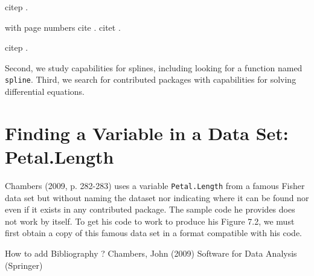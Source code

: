 citep \citep{JC09}.

with page numbers
cite \cite[pp. 282-283]{JC09}.
citet \citet[pp. 282-283]{JC09}.

citep \citep[pp. 282-283]{JC09}.

Second, we study \R{} capabilities
for splines, including looking for a function named {\tt spline}.  Third,
we search for contributed \R{} packages with capabilities for solving
differential equations.

\section*{Finding a Variable in a Data Set:  Petal.Length}

\citep[pp. 282-283]{JC09}
Chambers (2009, p. 282-283) uses a variable {\tt Petal.Length} from a
famous Fisher data set but without naming the dataset nor indicating
where it can be found nor even if it exists in any contributed \R{}
package.  The sample code he provides does not work by itself.  To get
his code to  work to produce his Figure 7.2, we must first obtain a
copy of this famous data set in a format compatible with his code.

How to add Bibliography ?
Chambers, John (2009) Software for Data Analysis (Springer)

